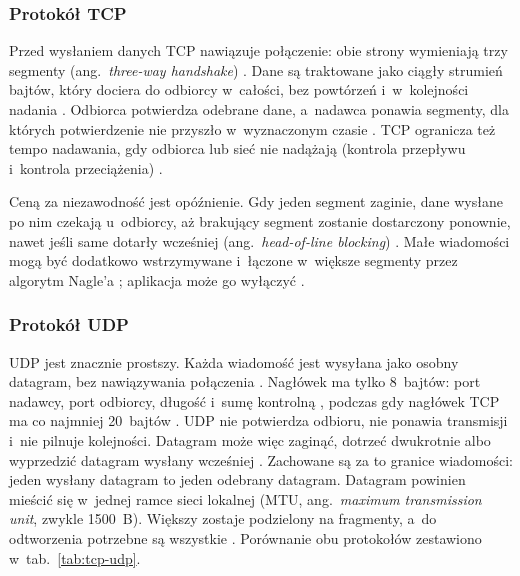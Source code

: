 \subsubsection*{Protokół TCP}

Przed wysłaniem danych TCP nawiązuje połączenie: obie strony wymieniają
trzy segmenty (ang.~\textit{three-way handshake}) \cite{rfc9293}. Dane są
traktowane jako ciągły strumień bajtów, który dociera do odbiorcy
w~całości, bez powtórzeń i~w~kolejności nadania \cite{rfc9293}. Odbiorca
potwierdza odebrane dane, a~nadawca ponawia segmenty, dla których
potwierdzenie nie przyszło w~wyznaczonym czasie \cite{rfc9293}. TCP
ogranicza też tempo nadawania, gdy odbiorca lub sieć nie nadążają
(kontrola przepływu i~kontrola przeciążenia) \cite{kurose_2021}.

Ceną za niezawodność jest opóźnienie. Gdy jeden segment zaginie, dane
wysłane po nim czekają u~odbiorcy, aż brakujący segment zostanie
dostarczony ponownie, nawet jeśli same dotarły wcześniej
(ang.~\textit{head-of-line blocking}) \cite{kurose_2021}. Małe wiadomości
mogą być dodatkowo wstrzymywane i~łączone w~większe segmenty przez
algorytm Nagle'a \cite{rfc896}; aplikacja może go wyłączyć
\cite{rfc9293}.

\subsubsection*{Protokół UDP}

UDP jest znacznie prostszy. Każda wiadomość jest wysyłana jako osobny
datagram, bez nawiązywania połączenia \cite{rfc768}. Nagłówek ma tylko
8~bajtów: port nadawcy, port odbiorcy, długość i~sumę kontrolną
\cite{rfc768}, podczas gdy nagłówek TCP ma co najmniej 20~bajtów
\cite{rfc9293}. UDP nie potwierdza odbioru, nie ponawia transmisji i~nie
pilnuje kolejności. Datagram może więc zaginąć, dotrzeć dwukrotnie albo
wyprzedzić datagram wysłany wcześniej \cite{kurose_2021}. Zachowane są za
to granice wiadomości: jeden wysłany datagram to jeden odebrany datagram.
Datagram powinien mieścić się w~jednej ramce sieci lokalnej (MTU,
ang.~\textit{maximum transmission unit}, zwykle 1500~B). Większy zostaje
podzielony na fragmenty, a~do odtworzenia potrzebne są wszystkie
\cite{kurose_2021}. Porównanie obu protokołów zestawiono
w~tab.~\ref{tab:tcp-udp}.

